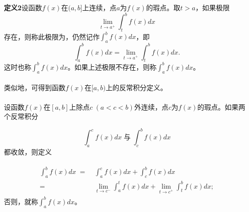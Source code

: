 \textbf{定义2\;}设函数$f(x)$在$(a,b]$上连续，点$a$为$f(x)$的瑕点。取$t>a$，如果极限
\begin{equation}
  \lim_{t \to a^+}\int_t^bf(x)dx
\end{equation}
存在，则称此极限为\uwave{函数{$f(x)$}在{$(a,b]$}上的反常积分}，仍然记作$\displaystyle\int_a^bf(x)dx$，即
\begin{equation}
  \int_a^bf(x)dx = \lim_{t \to a^+}\int_t^bf(x)dx.
\end{equation}
这时也称$\displaystyle\int_a^bf(x)dx$。如果上述极限不存在，则称$\displaystyle\int_a^bf(x)dx$。

\paragraph{}
类似地，可得到函数$f(x)$在$[a,b)$上的反常积分定义。

\paragraph{}
设函数$f(x)$在$[a,b]$上除点$c \; (a<c<b)$外连续，点$c$为$f(x)$的瑕点。如果两个反常积分

\begin{equation}
  \int_a^cf(x)dx \;\text{与}\; \int_c^bf(x)dx
\end{equation}
都收敛，则定义

\begin{align}
\begin{split}
  \int_a^bf(x)dx \;=&\; \int_a^cf(x)dx + \int_c^bf(x)dx \\
  =&\; \lim_{t \to c^-}\int_a^tf(x)dx + \lim_{t\to c^+}\int_t^bf(x)dx;
\end{split}
\end{align}
否则，就称$\displaystyle\int_a^bf(x)dx$。
